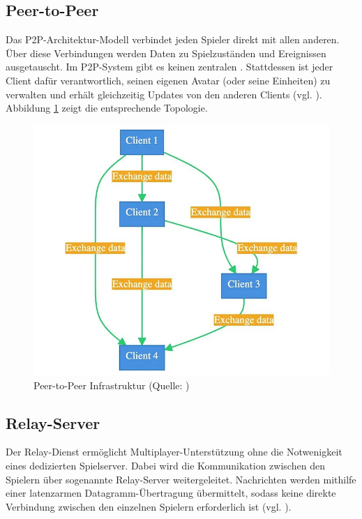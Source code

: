 \subsection{Peer-to-Peer}
Das \ac{P2P}-Architektur-Modell verbindet jeden Spieler direkt mit allen anderen. Über diese Verbindungen werden Daten zu Spielzuständen und Ereignissen ausgetauscht. Im  \ac{P2P}-System gibt es keinen zentralen . Stattdessen ist jeder Client dafür verantwortlich, seinen eigenen Avatar (oder seine Einheiten) zu verwalten und erhält gleichzeitig Updates von den anderen Clients (vgl. \cite{mygames_unity_2024}). Abbildung \ref{fig:p-2-p} zeigt die entsprechende Topologie.

\begin{figure}[ht]
\centering
\includegraphics[width=1\linewidth]{content/pictures/0_poGQC2fWQ3tPWPwT.png}
\caption{Peer-to-Peer Infrastruktur (Quelle: \cite{mygames_unity_2024})}
\label{fig:p-2-p}
\end{figure}


\subsection{Relay-Server}
Der Relay-Dienst ermöglicht Multiplayer-Unterstützung ohne die Notwenigkeit eines dedizierten Spielserver. Dabei wird die Kommunikation zwischen den Spielern über sogenannte Relay-Server weitergeleitet. Nachrichten werden mithilfe einer latenzarmen Datagramm-Übertragung übermittelt, sodass keine direkte Verbindung zwischen den einzelnen Spielern erforderlich ist (vgl. \cite{noauthor_relay_nodate}).

